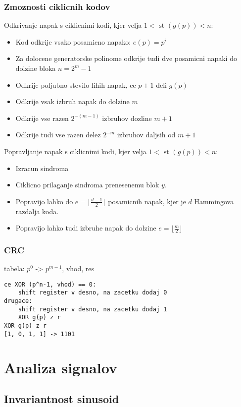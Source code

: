 \documentclass{article}
\begin{document}
\begin{multicols}{4}
	\subsubsection{Zmoznosti ciklicnih kodov}
	Odkrivanje napak s ciklicnimi kodi, kjer velja $1 < \text{ st }(g(p)) < n$:
	\begin{itemize}
		\item Kod odkrije vsako posamicno napako: $e(p) = p^i$
		\item Za dolocene generatorske polinome odkrije tudi dve posamicni napaki do dolzine bloka $n = 2^m -1$
		\item Odkrije poljubno stevilo lihih napak, ce $p + 1$ deli $g(p)$
		\item Odkrije vsak izbruh napak do dolzine $m$
		\item Odkrije vse razen $2^{-(m-1)}$ izbruhov dozline $m + 1$
		\item Odkrije tudi vse razen delez $2^{-m}$ izbruhov daljsih od $m + 1$
	\end{itemize}
	Popravljanje napak s ciklicnimi kodi, kjer velja $1 < \text{ st }(g(p)) < n$:
	\begin{itemize}
		\item Izracun sindroma
		\item Ciklicno prilaganje sindroma prenesenemu blok $y$.
		\item Popravijo lahko do $e = \lfloor \frac{d-1}{2} \rfloor$ posamicnih napak, kjer je
		      $d$ Hammingova razdalja koda.
		\item Popravijo lahko tudi izbruhe napak do dolzine $e = \lfloor \frac{m}{2} \rfloor$
	\end{itemize}

	\subsubsection{CRC}
	tabela: $p^0$ -> $p^{m-1}$, vhod, res
	\begin{verbatim}
ce XOR (p^n-1, vhod) == 0:
    shift register v desno, na zacetku dodaj 0
drugace:
    shift register v desno, na zacetku dodaj 1
    XOR g(p) z r
XOR g(p) z r
[1, 0, 1, 1] -> 1101
\end{verbatim}

	\section{Analiza signalov}

	\subsection{Invariantnost sinusoid}


\end{multicols}
\end{document}
